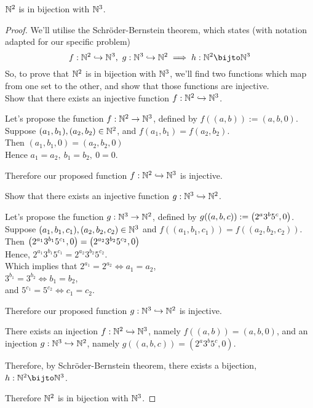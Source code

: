 \documentclass[a4paper, 11pt]{report}
\begin{document}
\Propo $\mathbb{N}^2$ is in bijection with $\mathbb{N}^3$.
\begin{proof}
  We'll utilise the Schr\"oder-Bernstein theorem, which states (with notation adapted for our specific problem)
  $$
    f:\bbn^2\injto\bbn^3,\ g:\bbn^3\injto\bbn^2 \implies h:\bbn^2\bijto\bbn^3
  $$
  So, to prove that $\mathbb{N}^2$ is in bijection with $\mathbb{N}^3$, we'll find two functions which map from one set to the other, and show that those functions are injective. \\

  Show that there exists an injective function $f:\mathbb{N}^2\hookrightarrow\mathbb{N}^3$.
  \begin{list}{}{\setlength{\leftmargin}{1in}\setlength{\topsep}{0pt}}\item 
    Let's propose the function $f:\mathbb{N}^2\to\mathbb{N}^3$, defined by $f((a,b)) := (a,b,0)$. \\
    Suppose $(a_1,b_1), (a_2,b_2)\in\mathbb{N}^2$, and $f(a_1,b_1) = f(a_2,b_2)$. \\
    Then $(a_1,b_1,0)=(a_2,b_2,0)$ \\
    Hence $a_1=a_2,\ b_1=b_2,\ 0=0$.

    Therefore our proposed function $f:\mathbb{N}^2\hookrightarrow\mathbb{N}^3$ is injective. \\
  \end{list}

  Show that there exists an injective function $g:\mathbb{N}^3\hookrightarrow\mathbb{N}^2$.
  \begin{list}{}{\setlength{\leftmargin}{1in}\setlength{\topsep}{0pt}}\item 
    Let's propose the function $g:\mathbb{N}^3\to\mathbb{N}^2$, defined by $g((a,b,c)) := \left( 2^a3^b5^c,0 \right)$. \\
    Suppose $(a_1,b_1,c_1), (a_2,b_2,c_2)\in\mathbb{N}^3$ and $f((a_1,b_1,c_1)) = f((a_2,b_2,c_2))$. \\
    Then $\left( 2^{a_1}3^{b_1}5^{c_1},0 \right) = \left( 2^{a_2}3^{b_2}5^{c_2},0 \right)$ \\
    Hence, $2^{a_1}3^{b_1}5^{c_1}=2^{a_2}3^{b_2}5^{c_2}$. \\
    Which implies that $2^{a_1}=2^{a_2}\iff a_1=a_2$, \\
    $3^{b_1}=3^{b_2}\iff b_1=b_2$, \\
    and $5^{c_1}=5^{c_2}\iff c_1=c_2$. 

    Therefore our proposed function $g:\mathbb{N}^3\hookrightarrow\mathbb{N}^2$ is injective. \\
  \end{list}

  There exists an injection $f:\mathbb{N}^2\hookrightarrow\mathbb{N}^3$, namely $f((a,b)) = (a,b,0)$, and an injection $g:\mathbb{N}^3\hookrightarrow\mathbb{N}^2$, namely $g((a,b,c)) = (2^a3^b5^c,0)$.

  Therefore, by Schr\"oder-Bernstein theorem, there exists a bijection, $h:\bbn^2\bijto\bbn^3$.

  Therefore $\mathbb{N}^2$ is in bijection with $\mathbb{N}^3$.
\end{proof} 
\end{document}
